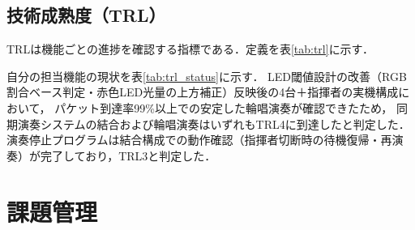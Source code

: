 \documentclass[lualatex,paper=a4paper,jafontsize=11.5pt,jafontscale=1.05]{jlreq}
\begin{document}
\subsection{技術成熟度（TRL）}
TRLは機能ごとの進捗を確認する指標である．定義を表\ref{tab:trl}に示す．

\begin{table}[H]
  \centering
  \caption{TRLの定義}
  \label{tab:trl}
\end{table}

自分の担当機能の現状を表\ref{tab:trl_status}に示す．
LED閾値設計の改善（RGB割合ベース判定・赤色LED光量の上方補正）反映後の4台＋指揮者の実機構成において，
パケット到達率99\%以上での安定した輪唱演奏が確認できたため，
同期演奏システムの結合および輪唱演奏はいずれもTRL4に到達したと判定した．
演奏停止プログラムは結合構成での動作確認（指揮者切断時の待機復帰・再演奏）が完了しており，TRL3と判定した．

\begin{table}[H]
  \centering
  \caption{担当機能のTRL現状}
  \label{tab:trl_status}
\end{table}

\section{課題管理}\label{sec:issues}
\end{document}
